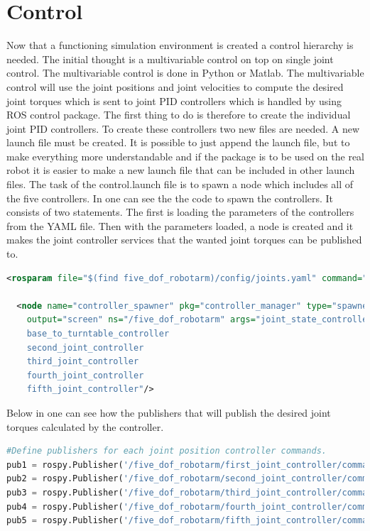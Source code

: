 \chapter{Control}

Now that a functioning simulation environment is created a control hierarchy is needed. The initial thought is a multivariable control on top on single joint control. The multivariable control is done in Python or Matlab. The multivariable control will use the joint positions and joint velocities to compute the desired joint torques which is sent to joint PID controllers which is handled by using ROS control package. The first thing to do is therefore to create the individual joint PID controllers. 
To create these controllers two new files are needed. A new launch file must be created. It is possible to just append the launch file, but to make everything more understandable and if the package is to be used on the real robot it is easier to make a new launch file that can be included in other launch files. The task of the control.launch file is to spawn a node which includes all of the five controllers. In  one can see the the code to spawn the controllers. It consists of two statements. The first is loading the parameters of the controllers from the YAML file. Then with the parameters loaded, a node is created and it makes the joint controller services that the wanted joint torques can be published to. 
\begin{lstlisting}[language=xml,caption={Spawns the controller node},label={lst:launchControl}]
<rosparam file="$(find five_dof_robotarm)/config/joints.yaml" command="load"/>

  <node name="controller_spawner" pkg="controller_manager" type="spawner" respawn="false"
	output="screen" ns="/five_dof_robotarm" args="joint_state_controller
    base_to_turntable_controller
    second_joint_controller
    third_joint_controller
    fourth_joint_controller
    fifth_joint_controller"/>
\end{lstlisting}
Below in  one can see how the publishers that will publish the desired joint torques calculated by the controller. 
\begin{lstlisting}[language=python,caption={Python code for creating the publishers.},label={lst:pythonPubl}]
#Define publishers for each joint position controller commands.
pub1 = rospy.Publisher('/five_dof_robotarm/first_joint_controller/command', Float64, queue_size=10)
pub2 = rospy.Publisher('/five_dof_robotarm/second_joint_controller/command', Float64, queue_size=10)
pub3 = rospy.Publisher('/five_dof_robotarm/third_joint_controller/command', Float64, queue_size=10)
pub4 = rospy.Publisher('/five_dof_robotarm/fourth_joint_controller/command', Float64, queue_size=10)
pub5 = rospy.Publisher('/five_dof_robotarm/fifth_joint_controller/command', Float64, queue_size=10)
\end{lstlisting}

